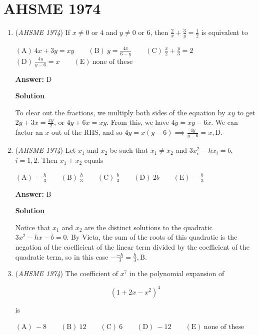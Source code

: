 \section{AHSME 1974}
        \begin{enumerate}
        	\item (\textit{AHSME 1974}) If $x\not=0$ or $4$ and $y\not=0$ or $6$, then $\frac{2}{x}+\frac{3}{y}=\frac{1}{2}$ is equivalent to


 $\mathrm{(A)\ } 4x+3y=xy \qquad \mathrm{(B) \ }y=\frac{4x}{6-y} \qquad \mathrm{(C) \  } \frac{x}{2}+\frac{y}{3}=2 \qquad$
$\mathrm{(D) \  } \frac{4y}{y-6}=x \qquad \mathrm{(E) \  }\text{none of these}$

 \textbf{Answer: }D



\textbf{Solution}

To clear out the fractions, we multiply both sides of the equation by $xy$ to get $2y+3x=\frac{xy}{2}$, or $4y+6x=xy$. From this, we have $4y=xy-6x$. We can factor an $x$ out of the RHS, and so $4y=x(y-6)\implies \frac{4y}{y-6}=x, \boxed{\text{D}}$.

 


	\item (\textit{AHSME 1974}) Let $x_1$ and $x_2$ be such that $x_1\not=x_2$ and $3x_i^2-hx_i=b$, $i=1, 2$. Then $x_1+x_2$ equals


 $\mathrm{(A)\ } -\frac{h}{3} \qquad \mathrm{(B) \ }\frac{h}{3} \qquad \mathrm{(C) \  } \frac{b}{3} \qquad \mathrm{(D) \  } 2b \qquad \mathrm{(E) \  }-\frac{b}{3}$

 \textbf{Answer: }B



\textbf{Solution}

Notice that $x_1$ and $x_2$ are the distinct solutions to the quadratic $3x^2-hx-b=0$. By Vieta, the sum of the roots of this quadratic is the negation of the coefficient of the linear term divided by the coefficient of the quadratic term, so in this case $-\frac{-h}{3}=\frac{h}{3}, \boxed{\text{B}}$.

 


	\item (\textit{AHSME 1974}) The coefficient of $x^7$ in the polynomial expansion of 


 
 \[(1+2x-x^2)^4\]


 is


 $\mathrm{(A)\ } -8 \qquad \mathrm{(B) \ }12 \qquad \mathrm{(C) \  } 6 \qquad \mathrm{(D) \  } -12 \qquad \mathrm{(E) \  }\text{none of these}$


\end{enumerate}
